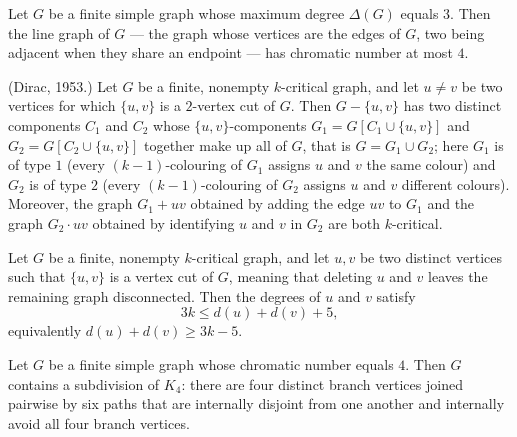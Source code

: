 \begin{theorem}
\label{SimpleGraph.chromaticIndex_le_four_of_maxDegree_three}
\leanok
Let $G$ be a finite simple graph whose maximum degree $\Delta(G)$ equals $3$. Then the
line graph of $G$ — the graph whose vertices are the edges of $G$, two being adjacent
when they share an endpoint — has chromatic number at most $4$.
\end{theorem}

\begin{theorem}
\label{SimpleGraph.kCritical_two_vertex_cut_structure}
\leanok
{}
(Dirac, 1953.) Let $G$ be a finite, nonempty $k$-critical graph, and let $u \neq v$ be
two vertices for which $\{u,v\}$ is a $2$-vertex cut of $G$. Then $G - \{u,v\}$ has two
distinct components $C_1$ and $C_2$ whose $\{u,v\}$-components $G_1 = G[C_1 \cup
\{u,v\}]$ and $G_2 = G[C_2 \cup \{u,v\}]$ together make up all of $G$, that is $G = G_1
\cup G_2$; here $G_1$ is of type $1$ (every $(k-1)$-colouring of $G_1$ assigns $u$ and
$v$ the same colour) and $G_2$ is of type $2$ (every $(k-1)$-colouring of $G_2$ assigns
$u$ and $v$ different colours). Moreover, the graph $G_1 + uv$ obtained by adding the
edge $uv$ to $G_1$ and the graph $G_2 \cdot uv$ obtained by identifying $u$ and $v$ in
$G_2$ are both $k$-critical.
\end{theorem}

\begin{theorem}
\label{SimpleGraph.kCritical_two_vertex_cut_degree_sum}
\leanok
{}
Let $G$ be a finite, nonempty $k$-critical graph, and let $u,v$ be two distinct vertices
such that $\{u,v\}$ is a vertex cut of $G$, meaning that deleting $u$ and $v$ leaves the
remaining graph disconnected. Then the degrees of $u$ and $v$ satisfy \[ 3k \le d(u) +
d(v) + 5, \] equivalently $d(u) + d(v) \ge 3k - 5$.
\end{theorem}

\begin{theorem}
\label{SimpleGraph.fourChromatic_hasK4Subdivision}
\leanok
{}
Let $G$ be a finite simple graph whose chromatic number equals $4$. Then $G$ contains a
subdivision of $K_4$: there are four distinct branch vertices joined pairwise by six
paths that are internally disjoint from one another and internally avoid all four branch
vertices.
\end{theorem}

